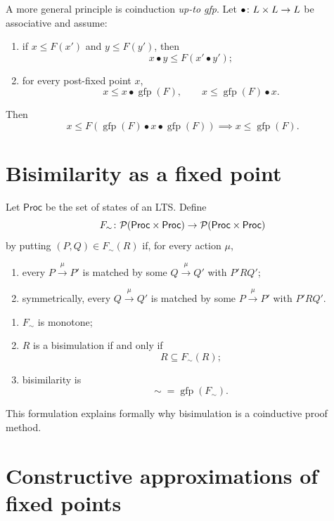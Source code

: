 \documentclass[a4paper]{article}
\newcommand{\Proc}{\mathsf{Proc}}
\newcommand{\trans}[1]{\xrightarrow{#1}}
\newcommand{\gfp}{\operatorname{gfp}}
\begin{document}
A more general principle is coinduction \emph{up-to gfp}.
Let \(\bullet\colon L\times L\to L\) be associative and assume:
\begin{enumerate}
    \item if \(x\leq F(x')\) and \(y\leq F(y')\), then
    \[
        x\bullet y\leq F(x'\bullet y');
    \]
    \item for every post-fixed point \(x\),
    \[
        x\leq x\bullet\gfp(F),
        \qquad
        x\leq\gfp(F)\bullet x.
    \]
\end{enumerate}
Then
\[
    x\leq F(\gfp(F)\bullet x\bullet\gfp(F))
    \implies
    x\leq\gfp(F).
\]

\section{Bisimilarity as a fixed point}

Let \(\Proc\) be the set of states of an LTS.
Define
\[
    F_{\sim}\colon\powerset(\Proc\cartesianprod\Proc)
    \fromto
    \powerset(\Proc\cartesianprod\Proc)
\]
by putting \((P,Q)\in F_{\sim}(R)\) if, for every action \(\mu\),
\begin{enumerate}
    \item every \(P\trans{\mu}P'\) is matched by some \(Q\trans{\mu}Q'\) with \(P'RQ'\);
    \item symmetrically, every \(Q\trans{\mu}Q'\) is matched by some \(P\trans{\mu}P'\) with \(P'RQ'\).
\end{enumerate}

\begin{snippetproposition}{}
    \begin{enumerate}
        \item \(F_{\sim}\) is monotone;
        \item \(R\) is a bisimulation if and only if
        \[
            R\subseteq F_{\sim}(R);
        \]
        \item bisimilarity is
        \[
            \sim\;=\gfp(F_{\sim}).
        \]
    \end{enumerate}
\end{snippetproposition}

This formulation explains formally why bisimulation is a coinductive proof method.

\section{Constructive approximations of fixed points}
\end{document}
